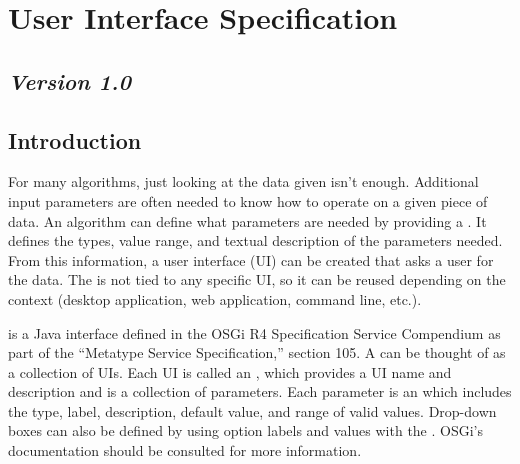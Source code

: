 %

\section{User Interface Specification}
\label{GUISpec}
\subsection*{\textit{Version 1.0}}
\subsection{Introduction}

For many algorithms, just looking at the data given isn't enough. Additional
input parameters are often needed to know how to operate on a given piece of
data. An algorithm can define what parameters are needed by providing a
. It defines the types, value range, and textual
description of the parameters needed. From this information, a user interface
(UI) can be created that asks a user for the data. The 
is not tied to any specific UI, so it can be reused depending on the context
(desktop application, web application, command line, etc.).

 is a Java interface defined in the OSGi R4 Specification
Service Compendium as part of the ``Metatype Service Specification,'' section
105. A  can be thought of as a collection of UIs. Each UI
is called an , which provides a UI name and
description and is a collection of parameters. Each parameter is an
 which includes the type, label, description, default
value, and range of valid values. Drop-down boxes can also be defined by using
option labels and values with the . OSGi's
documentation should be consulted for more information.

